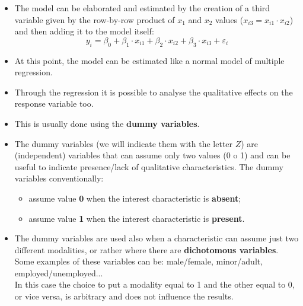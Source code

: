 \begin{frame}
  \vspace*{.5cm}
  \begin{itemize}
    \item The model can be elaborated and estimated by the creation of a third variable given by the row-by-row product of $ x_1 $ and $ x_2 $ values ($ x_{i3} = x_{i1} \cdot x_{i2} $) and then adding it to the model itself:\\
    \vspace{-0.4cm} $$ y_i = \beta_0 + \beta_1 \cdot x_{i1} + \beta_2 \cdot x_{i2} + \beta_3 \cdot x_{i3} + \varepsilon_i $$
    \vspace{0.5cm}
    \item At this point, the model can be estimated like a normal model of multiple regression.
  \end{itemize}
\end{frame}


\begin{frame}
  \begin{small}
    \begin{itemize}
      \item Through the regression it is possible to analyse the qualitative effects on the response variable too.
      \item This is usually done using the \textbf{dummy variables}.
      \item The dummy variables (we will indicate them with the letter $ Z $) are (independent) variables that can assume only two values (0 o 1) and can be useful to indicate presence/lack of qualitative characteristics. The dummy variables conventionally:
      \vspace{-0.2cm}
      \begin{itemize}
        \item assume value \textbf{0} when the interest characteristic is \textbf{absent};
        \item assume value \textbf{1} when the interest characteristic is \textbf{present}.
      \end{itemize}
      \item The dummy variables are used also when a characteristic can assume just two different modalities, or rather where there are \textbf{dichotomous variables}. Some examples of these variables can be: male/female, minor/adult, employed/unemployed...\\
        In this case the choice to put a modality equal to 1 and the other equal to 0, or vice versa, is arbitrary and does not influence the results.
    \end{itemize}
  \end{small}
\end{frame}

